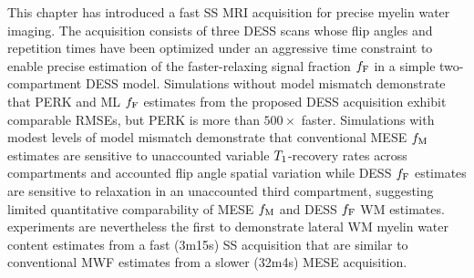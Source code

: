 This chapter has introduced 
a fast SS MRI acquisition
for precise myelin water imaging.
The acquisition consists
of three DESS scans
whose flip angles and repetition times
have been optimized 
under an aggressive time constraint
to enable precise estimation
of the faster-relaxing signal fraction $f_{\mathrm{F}}$ 
in a simple two-compartment DESS model.
Simulations without model mismatch demonstrate
that PERK and ML $f_{\mathrm{F}}$ estimates
from the proposed DESS acquisition
exhibit comparable RMSEs,
but PERK is more than $500\times$ faster.
Simulations with modest levels of model mismatch demonstrate
that conventional MESE $f_\mathrm{M}$ estimates are sensitive 
to unaccounted variable $T_1$-recovery rates across compartments
and accounted flip angle spatial variation
while DESS $f_{\mathrm{F}}$ estimates are sensitive 
to relaxation in an unaccounted third compartment,
suggesting limited quantitative comparability 
of MESE $f_\mathrm{M}$ and DESS $f_{\mathrm{F}}$ WM estimates. 
\Invivo experiments are nevertheless the first to demonstrate
lateral WM myelin water content estimates
from a fast (3m15s) SS acquisition
that are similar 
to conventional MWF estimates
from a slower (32m4s) MESE acquisition.
